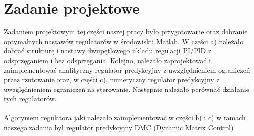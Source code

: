 \chapter{Zadanie projektowe}

Zadaniem projektowym tej części naszej pracy było przygotowanie oraz dobranie optymalnych nastawów regulatorów w środowisku Matlab. W części a) należało dobrać strukturę i nastawy dwupętlowego układu regulacji PI/PID z odsprzęganiem i bez odsprzęgania. Kolejno, należało zaprojektować i zaimplementować analityczny regulator predykcyjny z uwzględnieniem ograniczeń przez rzutowanie oraz, w części c), numeryczny regulator predykcyjny z uwzględnieniem ograniczeń na sterowanie. Następnie należało porównać działanie tych regulatorów.
\\\\ Algorymem regulatora jaki należało zaimplementować w części b) i c) w ramach naszego zadania był regulator predykcyjny DMC (Dynamic Matrix Control)
